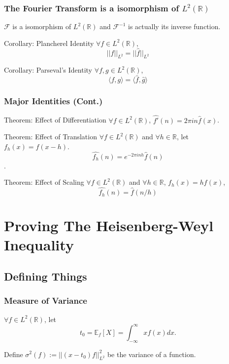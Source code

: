 \documentclass{beamer}
\newcommand{\h}[1]{\hat{#1}}
\newcommand{\R}{\mathbb{R}}
\newcommand{\abs}[1]{\left\lvert #1\right\rvert}
\newcommand{\angles}[1]{\langle #1 \rangle}
\begin{document}
\begin{frame}
    \frametitle{The Fourier Transform is a isomorphism of $L^2(\R)$ }

    \begin{theorem}
        $\mathcal{F}$ is a isomorphism of $L^2(\R)$ and $\mathcal{F}^{-1}$ is actually its inverse function.    
    \end{theorem}
    \pause
    \begin{block}{Corollary: Plancherel Identity}
        $\forall f \in L^2(\R)$, \[\abs{\abs{f}}_{L^2} = ||\h{f}||_{L^2}\] 
    \end{block}
    \pause
    \begin{block}{Corollary: Parseval's Identity}
        $\forall f, g \in L^2(\R)$, \[\angles{f, g} = \angles{\h{f}, \h{g}}\]  
    \end{block}
\end{frame}

\begin{frame}
    \frametitle{Major Identities (Cont.)}

    \begin{block}{Theorem: Effect of Differentiation}
        $\forall f \in L^2(\R)$, $            \h{f'}(n) = 2 \pi i n \h{f}(x)
$.   
    \end{block}

    \pause

    \begin{block}{Theorem: Effect of Translation}
        $\forall f \in L^2(\R)$ and $\forall h \in \R$, let $f_h(x) = f(x - h)$. \[\h{f_h}(n) = e^{-2 \pi i n h} \h{f}(n)\]. 
    \end{block}

    \pause

    \begin{block}{Theorem: Effect of Scaling}
        $\forall f \in L^2(\R)$ and $\forall h \in \R$, $f_h(x) = hf(x)$, \[\h{f_h}(n) = \h{f}(n / h)\]
    \end{block}

\end{frame}

\section{Proving The Heisenberg-Weyl Inequality}
\subsection{Defining Things}
\begin{frame}
    \frametitle{Measure of Variance}

    \begin{definition}
        $\forall f \in L^2(\R)$, let \[t_0 = \mathbb{E}_f[X] = \int_{-\infty}^{\infty}x f(x) dx.\] 
        
        Define $\sigma^2(f) := \abs{\abs{(x - t_0)f}}_{L^2}^2$ be the variance of a function.  
    \end{definition}

\end{frame}
\end{document}
